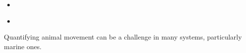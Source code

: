 \documentclass{article}
\begin{document}

\begin{itemize}
\item 
\end{itemize}

\begin{itemize}
\item 
\end{itemize}

\noindent Quantifying animal movement can be a challenge in many systems, particularly marine ones.
\end{document}
